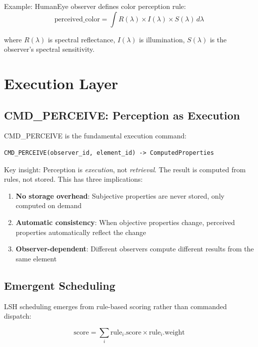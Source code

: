 \documentclass{article}
\begin{document}
Example: HumanEye observer defines color perception rule:
\begin{equation}
\text{perceived\_color} = \int R(\lambda) \times I(\lambda) \times S(\lambda) \, d\lambda
\end{equation}

where $R(\lambda)$ is spectral reflectance, $I(\lambda)$ is illumination, $S(\lambda)$ is the observer's spectral sensitivity.

\section{Execution Layer}

\subsection{CMD\_PERCEIVE: Perception as Execution}

CMD\_PERCEIVE is the fundamental execution command:

\begin{verbatim}
CMD_PERCEIVE(observer_id, element_id) -> ComputedProperties
\end{verbatim}

Key insight: Perception is \emph{execution}, not \emph{retrieval}. The result is computed from rules, not stored. This has three implications:

\begin{enumerate}
\item \textbf{No storage overhead}: Subjective properties are never stored, only computed on demand
\item \textbf{Automatic consistency}: When objective properties change, perceived properties automatically reflect the change
\item \textbf{Observer-dependent}: Different observers compute different results from the same element
\end{enumerate}

\subsection{Emergent Scheduling}

LSH scheduling emerges from rule-based scoring rather than commanded dispatch:

\begin{equation}
\text{score} = \sum_i \text{rule}_i.\text{score} \times \text{rule}_i.\text{weight}
\end{equation}
\end{document}
